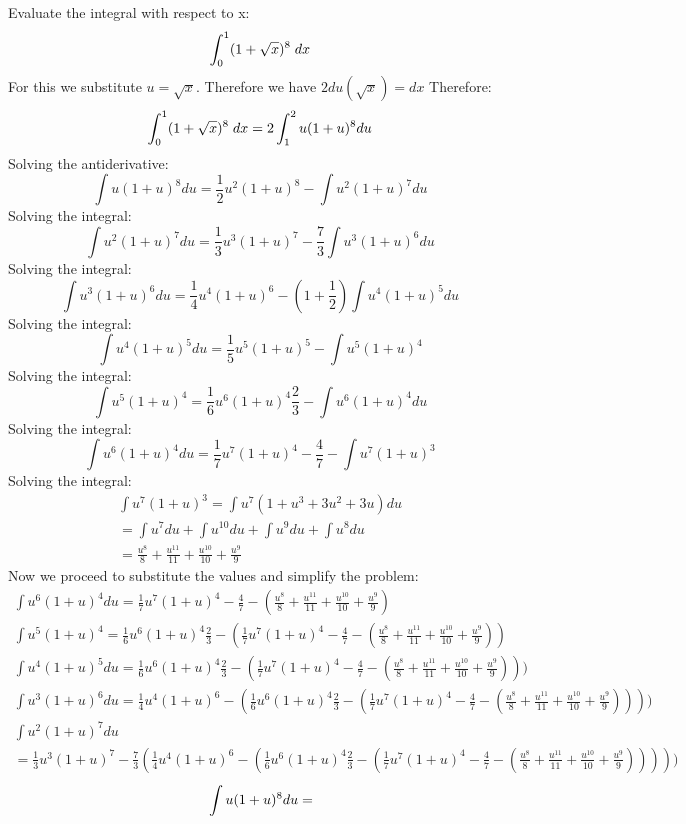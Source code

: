 \documentclass{article}
\begin{document}
Evaluate the integral with respect to x:
$$\int^{1}_{0} (1+\sqrt{x})^8 \hspace{1mm}dx$$
For this we substitute $u=\sqrt{x}$. Therefore we have $2du(\sqrt{x})=dx$ Therefore:
\begin{gather*}
\int^{1}_{0} (1+\sqrt{x})^8 \hspace{1mm}dx=2\int^{2}_{1} u(1+u)^8du
\end{gather*}
Solving the antiderivative:
$$\int u(1+u)^8du=\frac{1}{2}u^2(1+u)^8-\int u^2(1+u)^7du$$
Solving the integral:
$$\int u^2(1+u)^7du=\frac{1}{3}u^3(1+u)^7-\frac{7}{3}\int u^3(1+u)^6du$$
Solving the integral:
$$\int u^3(1+u)^6du=\frac{1}{4}u^4(1+u)^6-(1+\frac{1}{2})\int u^4 (1+u)^5du$$
Solving the integral:
$$\int u^4 (1+u)^5du=\frac{1}{5}u^5(1+u)^5-\int u^5(1+u)^4$$
Solving the integral:
$$\int u^5(1+u)^4=\frac{1}{6}u^6(1+u)^4\frac{2}{3}-\int u^6(1+u)^4du$$
Solving the integral:
$$\int u^6(1+u)^4du=\frac{1}{7}u^7(1+u)^4-\frac{4}{7}-\int u^7(1+u)^3$$
Solving the integral:
\begin{gather*}
\int u^7(1+u)^3=\int u^7(1+u^3+3u^2+3u)du
\\=\int u^7du+\int u^{10}du+\int u^9 du+\int u^8 du
\\=\frac{u^8}{8}+\frac{u^{11}}{11}+\frac{u^{10}}{10}+\frac{u^9}{ 9}
\end{gather*}
Now we proceed to substitute the values and simplify the problem:
\begin{gather*}
\int u^6(1+u)^4du=\frac{1}{7}u^7(1+u)^4-\frac{4}{7}-(\frac{u^8}{8}+\frac{u^{11}}{11}+\frac{u^{10}}{10}+\frac{u^9}{ 9})
\\\int u^5(1+u)^4=\frac{1}{6}u^6(1+u)^4\frac{2}{3}-(\frac{1}{7}u^7(1+u)^4-\frac{4}{7}-(\frac{u^8}{8}+\frac{u^{11}}{11}+\frac{u^{10}}{10}+\frac{u^9}{ 9}))
\\\int u^4 (1+u)^5du=\frac{1}{6}u^6(1+u)^4\frac{2}{3}-(\frac{1}{7}u^7(1+u)^4-\frac{4}{7}-(\frac{u^8}{8}+\frac{u^{11}}{11}+\frac{u^{10}}{10}+\frac{u^9}{ 9})))
\\\int u^3(1+u)^6du=\frac{1}{4}u^4(1+u)^6-(\frac{1}{6}u^6(1+u)^4\frac{2}{3}-(\frac{1}{7}u^7(1+u)^4-\frac{4}{7}-(\frac{u^8}{8}+\frac{u^{11}}{11}+\frac{u^{10}}{10}+\frac{u^9}{ 9}))))
\\\int u^2(1+u)^7du\\=\frac{1}{3}u^3(1+u)^7-\frac{7}{3}(\frac{1}{4}u^4(1+u)^6-(\frac{1}{6}u^6(1+u)^4\frac{2}{3}-(\frac{1}{7}u^7(1+u)^4-\frac{4}{7}-(\frac{u^8}{8}+\frac{u^{11}}{11}+\frac{u^{10}}{10}+\frac{u^9}{ 9})))))
\end{gather*}
$$\\\int u(1+u)^8du\\=$$
\end{document}
